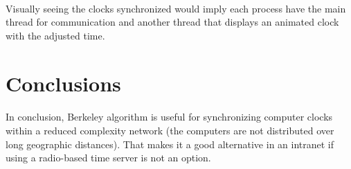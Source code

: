 \documentclass[12pt]{article}
\begin{document}
\paragraph{}
Visually seeing the clocks synchronized would imply each process have the main thread for communication and another thread that displays an animated clock with the adjusted time.

\section{Conclusions}
\paragraph{}
In conclusion, Berkeley algorithm is useful for synchronizing computer clocks within a reduced complexity network (the computers are not distributed over long geographic distances). That makes it a good alternative in an intranet if using a radio-based time server is not an option.




\end{document}
